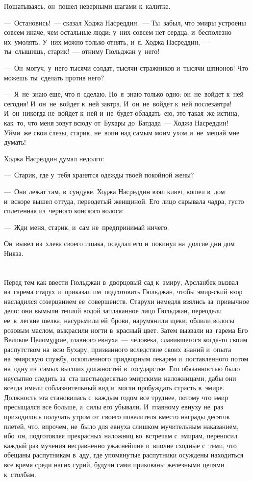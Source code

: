 \documentclass[12pt,a4paper]{book}
\begin{document}
Пошатываясь, он~пошел неверными шагами к~калитке.

—~Остановись!~— сказал Ходжа Насреддин.~— Ты~забыл, что эмиры устроены совсем иначе, чем остальные люди: у~них совсем нет сердца, и~бесполезно их~умолять. У~них можно только отнять, и~я. Ходжа Насреддин,~— ты~слышишь, старик!~— отниму Гюльджан у~него!

—~Он~могуч, у~него тысячи солдат, тысячи стражников и~тысячи шпионов! Что можешь ты~сделать против него?

—~Я~не~знаю еще, что я~сделаю. Но~я~знаю только одно: он~не~войдет к~ней сегодня! И~он~не~войдет к~ней завтра. И~он~не~войдет к~ней послезавтра! И~он~никогда не~войдет к~ней и~не~будет обладать~ею, это такая~же истина, как~то, что меня зовут всюду от~Бухары до~Багдада~— Ходжа Насреддин! Уйми~же свои слезы, старик, не~вопи над самым моим ухом и~не~мешай мне думать!

Ходжа Насреддин думал недолго:

—~Старик, где у~тебя хранятся одежды твоей покойной жены?

—~Они лежат там, в~сундуке. Ходжа Насреддин взял ключ, вошел в~дом и~вскоре вышел оттуда, переодетый женщиной. Его лицо скрывала чадра, густо сплетенная из~черного конского волоса:

—~Жди меня, старик, и~сам не~предпринимай ничего.

Он~вывел из~хлева своего ишака, оседлал его и~покинул на~долгие дни дом Нияза.


\chapter{}

Перед тем как ввести Гюльджан в~дворцовый сад к~эмиру, Арсланбек вызвал из~гарема старух и~приказал им~подготовить Гюльджан, чтобы эмир-ский взор насладился созерцанием ее~совершенств. Старухи немедля взялись за~привычное дело: они вымыли теплой водой заплаканное лицо Гюльджан, переодели ее~в~легкие шелка, насурьмили ей~брови, нарумянили щеки, облили волосы розовым маслом, выкрасили ногти в~красный цвет. Затем вызвали из~гарема Его Великое Целомудрие, главного евнуха~— человека, славившегося когда-то своим распутством на~всю Бухару, призванного вследствие своих знаний и~опыта на~эмирскую службу, оскопленного придворным лекарем и~поставленного потом на~одну из~самых высших должностей в~государстве. Его обязанностью было неусыпно следить за~ста шестьюдесятью эмирскими наложницами, дабы они всегда имели соблазнительный вид и~могли пробуждать страсть в~эмире. Должность эта становилась с~каждым годом все труднее, потому что эмир пресыщался все больше, а~силы его убывали. И~главному евнуху не~раз приходилось получать утром от~своего повелителя вместо награды десяток плетей, что, впрочем, не~было для евнуха слишком мучительным наказанием, ибо~он, подготовляя прекрасных наложниц ко~встречам с~эмирам, переносил каждый раз мучения несравненно ужаснейшие и~вполне сходные с~теми, что обещаны распутникам в~аду, где упомянутые распутники осуждены находиться все время среди нагих гурий, будучи сами прикованы железными цепями к~столбам.
\end{document}
